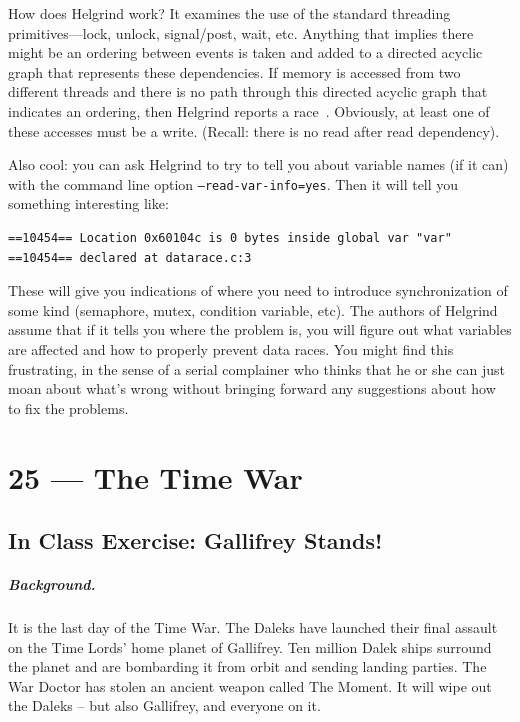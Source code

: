 \documentclass[a4paper]{report}
\begin{document}
How does Helgrind work? It examines the use of the standard threading primitives---lock, unlock, signal/post, wait, etc. Anything that implies there might be an ordering between events is taken and added to a directed acyclic graph that represents these dependencies. If memory is accessed from two different threads and there is no path through this directed acyclic graph that indicates an ordering, then Helgrind reports a race~\cite{helgrind}. Obviously, at least one of these accesses must be a write. (Recall: there is no read after read dependency).

Also cool: you can ask Helgrind to try to tell you about variable names (if it can) with the command line option \texttt{--read-var-info=yes}. Then it will tell you something interesting like:

\begin{lstlisting}
==10454== Location 0x60104c is 0 bytes inside global var "var"
==10454== declared at datarace.c:3
\end{lstlisting}

These will give you indications of where you need to introduce synchronization of some kind (semaphore, mutex, condition variable, etc). The authors of Helgrind assume that if it tells you where the problem is, you will figure out what variables are affected and how to properly prevent data races. You might find this frustrating, in the sense of a serial complainer who thinks that he or she can just moan about what's wrong without bringing forward any suggestions about how to fix the problems.









\chapter*{25 --- The Time War}


\section*{In Class Exercise: Gallifrey Stands!}

\paragraph{Background.}
It is the last day of the Time War. The Daleks have launched their final assault on the Time Lords' home planet of Gallifrey. Ten million Dalek ships surround the planet and are bombarding it from orbit and sending landing parties. The War Doctor has stolen an ancient weapon called The Moment. It will wipe out the Daleks -- but also Gallifrey, and everyone on it.
\end{document}
